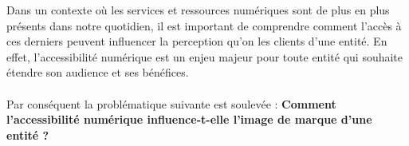 \documentclass[12pt, a4paper]{report}
\begin{document}
\noindent
Dans un contexte où les services et ressources numériques sont de plus en plus
présents dans notre quotidien, il est important de comprendre comment l'accès à
ces derniers peuvent influencer la perception qu'on les clients d'une entité.
En effet, l'accessibilité numérique est un enjeu majeur pour toute entité qui 
souhaite étendre son audience et ses bénéfices.
\\\\
Par conséquent la problématique suivante est soulevée : \textbf{Comment
l'accessibilité numérique influence-t-elle l'image de marque d'une entité ?}









\end{document}
